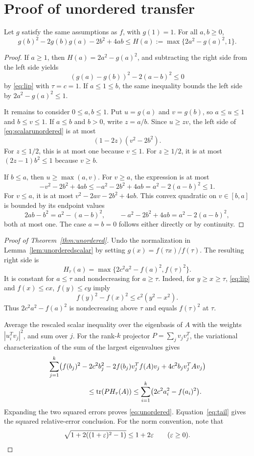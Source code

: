 \documentclass[11pt]{article}
\begin{document}
\section{Proof of unordered transfer}
\begin{lemma}\label{lem:unorderedscalar}
Let $g$ satisfy the same assumptions as $f$, with $g(1)=1$. For all $a,b\ge0$,
\begin{equation}\label{eq:scalarunordered}
 g(b)^2-2g(b)g(a)-2b^2+4ab
 \le H(a):=\max\{2a^2-g(a)^2,1\}.
\end{equation}
\end{lemma}
\begin{proof}
If $a\ge1$, then $H(a)=2a^2-g(a)^2$, and subtracting the right side from the left side yields
\[
 (g(a)-g(b))^2-2(a-b)^2\le0
\]
by \eqref{eq:lip} with $\tau=c=1$. If $a\le1\le b$, the same inequality bounds the left side by $2a^2-g(a)^2\le1$.

It remains to consider $0\le a,b\le1$. Put $u=g(a)$ and $v=g(b)$, so $a\le u\le1$ and $b\le v\le1$. If $a\le b$ and $b>0$, write $z=a/b$. Since $u\ge zv$, the left side of \eqref{eq:scalarunordered} is at most
\[
 (1-2z)(v^2-2b^2).
\]
For $z\le1/2$, this is at most one because $v\le1$. For $z\ge1/2$, it is at most $(2z-1)b^2\le1$ because $v\ge b$.

If $b\le a$, then $u\ge\max(a,v)$. For $v\ge a$, the expression is at most
\[
 -v^2-2b^2+4ab\le-a^2-2b^2+4ab
 =a^2-2(a-b)^2\le1.
\]
For $v\le a$, it is at most $v^2-2av-2b^2+4ab$. This convex quadratic on $v\in[b,a]$ is bounded by its endpoint values
\[
 2ab-b^2=a^2-(a-b)^2,\qquad
 -a^2-2b^2+4ab=a^2-2(a-b)^2,
\]
both at most one. The case $a=b=0$ follows either directly or by continuity.
\end{proof}

\begin{proof}[Proof of Theorem~\ref{thm:unordered}]
Undo the normalization in Lemma~\ref{lem:unorderedscalar} by setting $g(x)=f(\tau x)/f(\tau)$. The resulting right side is
\[
 H_\tau(a)=\max\{2c^2a^2-f(a)^2,f(\tau)^2\}.
\]
It is constant for $a\le\tau$ and nondecreasing for $a\ge\tau$. Indeed, for $y\ge x\ge\tau$, \eqref{eq:lip} and $f(x)\le cx$, $f(y)\le cy$ imply
\[
 f(y)^2-f(x)^2\le c^2(y^2-x^2).
\]
Thus $2c^2a^2-f(a)^2$ is nondecreasing above $\tau$ and equals $f(\tau)^2$ at $\tau$.

Average the rescaled scalar inequality over the eigenbasis of $A$ with the weights $|u_i^Tv_j|^2$, and sum over $j$. For the rank-$k$ projector $P=\sum_jv_jv_j^T$, the variational characterization of the sum of the largest eigenvalues gives
\begin{align*}
 &\sum_{j=1}^k\bigl(f(b_j)^2-2c^2b_j^2
       -2f(b_j)v_j^Tf(A)v_j+4c^2b_jv_j^TAv_j\bigr)\\
 &\hspace{20mm}\le\tr(PH_\tau(A))
 \le\sum_{i=1}^k\bigl(2c^2a_i^2-f(a_i)^2\bigr).
\end{align*}
Expanding the two squared errors proves \eqref{eq:unordered}. Equation~\eqref{eq:tail} gives the squared relative-error conclusion. For the norm convention, note that
\[
 \sqrt{1+2((1+\varepsilon)^2-1)}\le1+2\varepsilon
 \qquad(\varepsilon\ge0).
\]
\end{proof}
\end{document}
